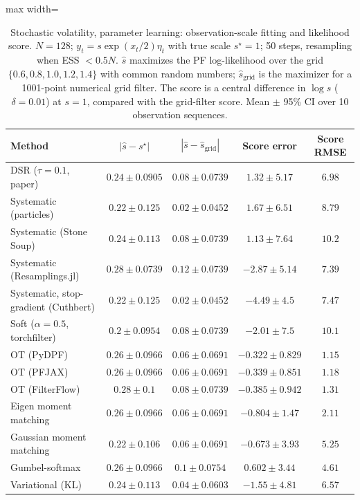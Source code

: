 \begin{table}[H]
\centering
\small
\caption{Stochastic volatility, parameter learning: observation-scale fitting and likelihood score. $N{=}128$; $y_t=s\exp(x_t/2)\eta_t$ with true scale $s^\star{=}1$; 50 steps, resampling when ESS $<0.5N$. $\hat s$ maximizes the PF log-likelihood over the grid $\{0.6,0.8,1.0,1.2,1.4\}$ with common random numbers; $\hat s_{\mathrm{grid}}$ is the maximizer for a 1001-point numerical grid filter. The score is a central difference in $\log s$ ($\delta{=}0.01$) at $s{=}1$, compared with the grid-filter score. Mean $\pm$ 95\% CI over 10 observation sequences.}
\label{tab:volatility-learning}
\begin{adjustbox}{max width=\linewidth}
\begin{tabular}{lcccc}
\toprule
Method & $|\hat s-s^\star|$ & $|\hat s-\hat s_{\mathrm{grid}}|$ & Score error & Score RMSE \\
\midrule
DSR ($\tau{=}0.1$, paper) & $0.24\pm0.0905$ & $0.08\pm0.0739$ & $1.32\pm5.17$ & $6.98$ \\
\midrule
Systematic (particles) & $0.22\pm0.125$ & $\mathbf{0.02\pm0.0452}$ & $1.67\pm6.51$ & $8.79$ \\
Systematic (Stone Soup) & $0.24\pm0.113$ & $0.08\pm0.0739$ & $1.13\pm7.64$ & $10.2$ \\
Systematic (Resamplings.jl) & $0.28\pm0.0739$ & $0.12\pm0.0739$ & $-2.87\pm5.14$ & $7.39$ \\
Systematic, stop-gradient (Cuthbert) & $0.22\pm0.125$ & $\mathbf{0.02\pm0.0452}$ & $-4.49\pm4.5$ & $7.47$ \\
Soft ($\alpha{=}0.5$, torchfilter) & $\mathbf{0.2\pm0.0954}$ & $0.08\pm0.0739$ & $-2.01\pm7.5$ & $10.1$ \\
OT (PyDPF) & $0.26\pm0.0966$ & $0.06\pm0.0691$ & $\mathbf{-0.322\pm0.829}$ & $\mathbf{1.15}$ \\
OT (PFJAX) & $0.26\pm0.0966$ & $0.06\pm0.0691$ & $-0.339\pm0.851$ & $1.18$ \\
OT (FilterFlow) & $0.28\pm0.1$ & $0.08\pm0.0739$ & $-0.385\pm0.942$ & $1.31$ \\
Eigen moment matching & $0.26\pm0.0966$ & $0.06\pm0.0691$ & $-0.804\pm1.47$ & $2.11$ \\
Gaussian moment matching & $0.22\pm0.106$ & $0.06\pm0.0691$ & $-0.673\pm3.93$ & $5.25$ \\
Gumbel-softmax & $0.26\pm0.0966$ & $0.1\pm0.0754$ & $0.602\pm3.44$ & $4.61$ \\
Variational (KL) & $0.24\pm0.113$ & $0.04\pm0.0603$ & $-1.55\pm4.81$ & $6.57$ \\

\end{tabular}
\end{adjustbox}
\end{table}
